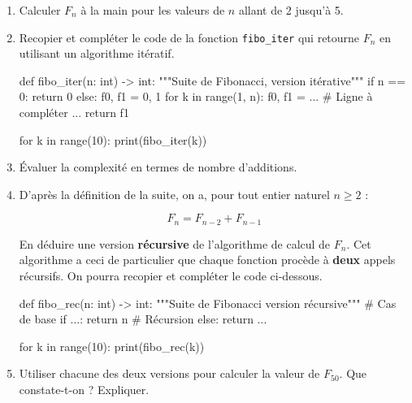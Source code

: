 \documentclass[
  a4paper,
  DIV=11,
  numbers=noendperiod]{scrartcl}
\newenvironment{Shaded}{\begin{snugshade}}{\end{snugshade}}
\newcommand{\BuiltInTok}[1]{\textcolor[rgb]{0.00,0.23,0.31}{#1}}
\newcommand{\CommentTok}[1]{\textcolor[rgb]{0.37,0.37,0.37}{#1}}
\newcommand{\ControlFlowTok}[1]{\textcolor[rgb]{0.00,0.23,0.31}{#1}}
\newcommand{\DecValTok}[1]{\textcolor[rgb]{0.68,0.00,0.00}{#1}}
\newcommand{\KeywordTok}[1]{\textcolor[rgb]{0.00,0.23,0.31}{#1}}
\newcommand{\NormalTok}[1]{\textcolor[rgb]{0.00,0.23,0.31}{#1}}
\newcommand{\OperatorTok}[1]{\textcolor[rgb]{0.37,0.37,0.37}{#1}}
\begin{document}
\begin{enumerate}
\def\labelenumi{\arabic{enumi}.}
\item
  Calculer \(F_n\) à la main pour les valeurs de \(n\) allant de 2
  jusqu'à 5.
\item
  Recopier et compléter le code de la fonction \texttt{fibo\_iter} qui
  retourne \(F_n\) en utilisant un algorithme itératif.

\begin{Shaded}
\begin{Highlighting}[]
\KeywordTok{def}\NormalTok{ fibo\_iter(n: }\BuiltInTok{int}\NormalTok{) }\OperatorTok{{-}\textgreater{}} \BuiltInTok{int}\NormalTok{:}
    \CommentTok{"""Suite de Fibonacci, version itérative"""}
    \ControlFlowTok{if}\NormalTok{ n }\OperatorTok{==} \DecValTok{0}\NormalTok{:}
        \ControlFlowTok{return} \DecValTok{0}
    \ControlFlowTok{else}\NormalTok{:}
\NormalTok{        f0, f1 }\OperatorTok{=} \DecValTok{0}\NormalTok{, }\DecValTok{1}
        \ControlFlowTok{for}\NormalTok{ k }\KeywordTok{in} \BuiltInTok{range}\NormalTok{(}\DecValTok{1}\NormalTok{, n):}
\NormalTok{            f0, f1 }\OperatorTok{=}\NormalTok{ ...  }\CommentTok{\# Ligne à compléter ...}
        \ControlFlowTok{return}\NormalTok{ f1}


\ControlFlowTok{for}\NormalTok{ k }\KeywordTok{in} \BuiltInTok{range}\NormalTok{(}\DecValTok{10}\NormalTok{):}
    \BuiltInTok{print}\NormalTok{(fibo\_iter(k))}
\end{Highlighting}
\end{Shaded}
\item
  Évaluer la complexité en termes de nombre d'additions.
\item
  D'après la définition de la suite, on a, pour tout entier naturel
  \(n\geqslant 2\) :

  \[F_{n}=F_{n-2}+F_{n-1}\]

  En déduire une version \textbf{récursive} de l'algorithme de calcul de
  \(F_n\). Cet algorithme a ceci de particulier que chaque fonction
  procède à \textbf{deux} appels récursifs. On pourra recopier et
  compléter le code ci-dessous.

\begin{Shaded}
\begin{Highlighting}[]
\KeywordTok{def}\NormalTok{ fibo\_rec(n: }\BuiltInTok{int}\NormalTok{) }\OperatorTok{{-}\textgreater{}} \BuiltInTok{int}\NormalTok{:}
    \CommentTok{"""Suite de Fibonacci version récursive"""}
    \CommentTok{\# Cas de base}
    \ControlFlowTok{if}\NormalTok{ ...:}
        \ControlFlowTok{return}\NormalTok{ n}
    \CommentTok{\# Récursion}
    \ControlFlowTok{else}\NormalTok{:}
        \ControlFlowTok{return}\NormalTok{ ...}


\ControlFlowTok{for}\NormalTok{ k }\KeywordTok{in} \BuiltInTok{range}\NormalTok{(}\DecValTok{10}\NormalTok{):}
    \BuiltInTok{print}\NormalTok{(fibo\_rec(k))}
\end{Highlighting}
\end{Shaded}
\item
  Utiliser chacune des deux versions pour calculer la valeur de
  \(F_{50}\). Que constate-t-on ? Expliquer.
\end{enumerate}
\end{document}
